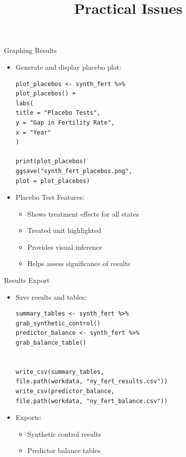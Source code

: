\documentclass[dvipsnames,hyperref={pdfpagelabels=false}]{beamer}
\begin{document}
\begin{frame}[fragile]{Graphing Results}
\begin{itemize}
\item Generate and display placebo plot:
\vspace{0.2cm}
\begin{lstlisting}
plot_placebos <- synth_fert %>%
plot_placebos() +
labs(
title = "Placebo Tests",
y = "Gap in Fertility Rate",
x = "Year"
)

print(plot_placebos)
ggsave("synth_fert_placebos.png", 
plot = plot_placebos)
\end{lstlisting}
\item Placebo Test Features:
\begin{itemize}
	\item Shows treatment effects for all states
	\item Treated unit highlighted
	\item Provides visual inference
	\item Helps assess significance of results
\end{itemize}
\end{itemize}
\end{frame}

\begin{frame}[fragile]{Results Export}
\begin{itemize}
\item Save results and tables:
\vspace{0.2cm}
\begin{lstlisting}
summary_tables <- synth_fert %>%
grab_synthetic_control()
predictor_balance <- synth_fert %>%
grab_balance_table()


write_csv(summary_tables, 
file.path(workdata, "ny_fert_results.csv"))
write_csv(predictor_balance, 
file.path(workdata, "ny_fert_balance.csv"))
\end{lstlisting}
\item Exports:
\begin{itemize}
\item Synthetic control results
\item Predictor balance tables
\end{itemize}
\end{itemize}
\end{frame}









\title[]  
{Practical Issues}
\end{document}
